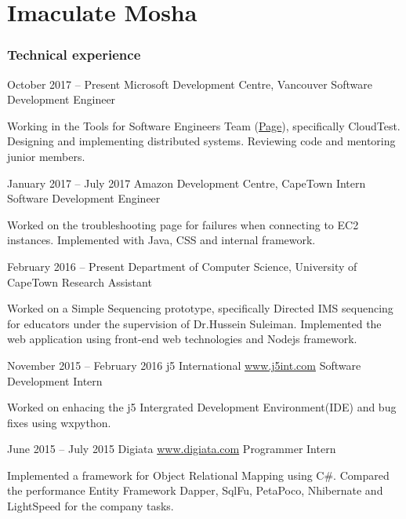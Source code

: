 \documentclass[fontsize=9pt]{tccv}
\begin{document}
\part{Imaculate Mosha}

\section{Technical experience}

\begin{eventlist}

\item{October 2017 -- Present}
	 {Microsoft Development Centre, Vancouver}
	 {Software Development Engineer}
	 
Working in the Tools for Software Engineers Team (\href{ https://www.microsoft.com/en-us/research/project/tools-for-software-engineers/}{Page}), specifically CloudTest.
Designing and implementing distributed systems.
Reviewing code and mentoring junior members.

\item{January 2017 -- July 2017}
	 {Amazon Development Centre, CapeTown}
	 {Intern Software Development Engineer}
	 
Worked on the troubleshooting page for failures when connecting to EC2 instances.
Implemented with Java, CSS and internal framework.


\item{February 2016 -- Present}
	 {Department of Computer Science, University of CapeTown}
	 {Research Assistant}
	 
Worked on a Simple Sequencing prototype, specifically Directed IMS sequencing for educators under the supervision of Dr.Hussein Suleiman.  
Implemented the web application using front-end web technologies and Nodejs framework. 


\item{November 2015 -- February 2016}
     {j5 International \url{www.j5int.com}}
     {Software Development Intern}

Worked on enhacing the j5 Intergrated Development Environment(IDE) and bug fixes using wxpython.

\item{June 2015 -- July 2015}
     {Digiata \url{www.digiata.com}}
     {Programmer Intern}

Implemented a framework for Object Relational Mapping using C\#.
Compared the performance Entity Framework Dapper, SqlFu, PetaPoco, Nhibernate and LightSpeed for the company tasks.


\end{eventlist}
\end{document}
